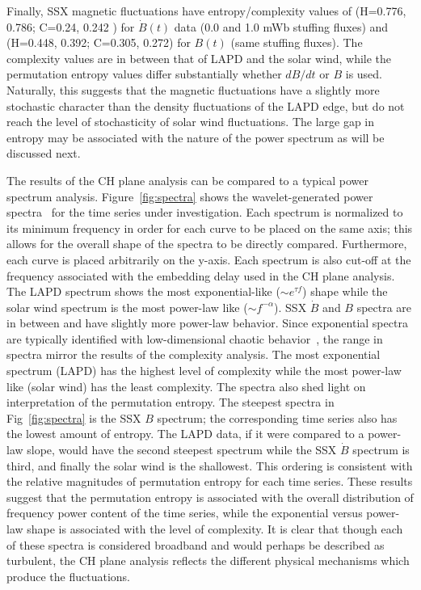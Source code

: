 \documentclass[aps,prx,twocolumn,secnumarabic,nobalancelastpage,amsmath,amssymb,
nofootinbib]{revtex4-1}
\begin{document}
Finally, SSX magnetic fluctuations have entropy/complexity values of (H=0.776, 0.786; C=0.24, 0.242 ) for $\dot{B}(t)$ data (0.0 and 1.0 mWb stuffing fluxes) and (H=0.448, 0.392; C=0.305, 0.272) for $B(t)$ (same stuffing fluxes). The complexity values are in between that of LAPD and the solar wind, while the permutation entropy values differ substantially whether $dB/dt$ or $B$ is used. Naturally, this suggests that the magnetic fluctuations have a slightly more stochastic character than the density fluctuations of the LAPD edge, but do not reach the level of stochasticity of solar wind fluctuations. The large gap in entropy may be associated with the nature of the power spectrum as will be discussed next.

The results of the CH plane analysis can be compared to a typical power spectrum analysis. Figure~\ref{fig:spectra} shows the wavelet-generated power spectra~\cite{torrence1998} for the time series under investigation. Each spectrum is normalized to its minimum frequency in order for each curve to be placed on the same axis; this allows for the overall shape of the spectra to be directly compared. Furthermore, each curve is placed arbitrarily on the y-axis. Each spectrum is also cut-off at the frequency associated with the embedding delay used in the CH plane analysis. The LAPD spectrum shows the most exponential-like ($\sim e^{\tau f}$) shape while the solar wind spectrum is the most power-law like ($\sim f^{-\alpha}$). SSX $\dot{B}$ and $B$ spectra are in between and have slightly more power-law behavior. Since exponential spectra are typically identified with low-dimensional chaotic behavior~\cite{maggs2012}, the range in spectra mirror the results of the complexity analysis. The most exponential spectrum (LAPD) has the highest level of complexity while the most power-law like (solar wind) has the least complexity. The spectra also shed light on interpretation of the permutation entropy. The steepest spectra in Fig~\ref{fig:spectra} is the SSX $B$ spectrum; the corresponding time series also has the lowest amount of entropy. The LAPD data, if it were compared to a power-law slope, would have the second steepest spectrum while the SSX $\dot{B}$ spectrum is third, and finally the solar wind is the shallowest. This ordering is consistent with the relative magnitudes of permutation entropy for each time series. These results suggest that the permutation entropy is associated with the overall distribution of frequency power content of the time series, while the exponential versus power-law shape is associated with the level of complexity. It is clear that though each of these spectra is considered broadband and would perhaps be described as turbulent, the CH plane analysis reflects the different physical mechanisms which produce the fluctuations.
\end{document}
